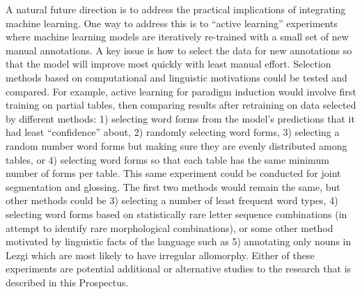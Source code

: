 A natural future direction is to address the practical implications of integrating machine learning. One way to address this is to ``active learning'' experiments where machine learning models are iteratively re-trained with a small set of new manual annotations. A key issue is how to select the data for new annotations so that the model will improve most quickly with least manual effort. Selection methods based on computational and linguistic motivations could be tested and compared. For example, active learning for paradigm induction would involve first training on partial tables, then comparing results after retraining on data selected by different methods: 1) selecting word forms from the model’s predictions that it had least ``confidence'' about, 2) randomly selecting word forms, 3) selecting a random number word forms but making sure they are evenly distributed among tables, or 4) selecting word forms so that each table has the same minimum number of forms per table. This same experiment could be conducted for joint segmentation and glossing. The first two methods would remain the same, but other methods could be 3) selecting a number of least frequent word types, 4) selecting word forms based on statistically rare letter sequence combinations (in attempt to identify rare morphological combinations), or some other method motivated by linguistic facts of the language such as 5) annotating only nouns in Lezgi which are most likely to have irregular allomorphy. Either of these experiments are potential additional or alternative studies to the research that is described in this Prospectus.
